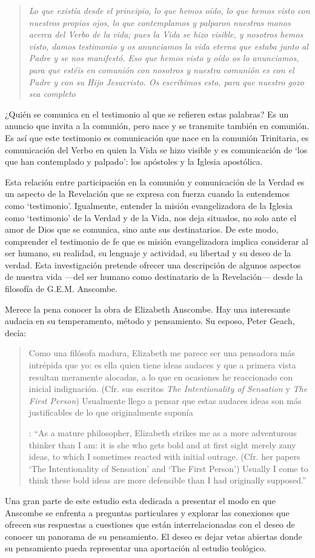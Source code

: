 \blockquote[][\,(1 Jn 1-4)]{\emph{Lo que existía desde el principio, lo que hemos oído, lo que hemos visto con nuestros propios ojos, lo que contemplamos y palparon nuestras manos acerca del Verbo de la vida; pues la Vida se hizo visible, y nosotros hemos visto, damos testimonio y os anunciamos la vida eterna que estaba junto al Padre y se nos manifestó. Eso que hemos visto y oído os lo anunciamos, para que estéis en comunión con nosotros y nuestra comunión es con el Padre y con su Hijo Jesucristo. Os escribimos esto, para que nuestro gozo sea completo}}. ¿Quién se comunica en el testimonio al que se refieren estas palabras? Es un anuncio que invita a la comunión, pero nace y se transmite también en comunión. Es así que este testimonio es comunicación que nace en la comunión Trinitaria, es comunicación del Verbo en quien la Vida se hizo visible y es comunicación de \enquote*{los que han contemplado y palpado}: los apóstoles y la Iglesia apostólica.

Esta relación entre participación en la comunión y comunicación de la Verdad es un aspecto de la Revelación que se expresa con fuerza cuando la entendemos como `testimonio'. Igualmente, entender la misión evangelizadora de la Iglesia como `testimonio' de la Verdad y de la Vida, nos deja situados, no solo ante el amor de Dios que se comunica, sino ante sus destinatarios. De este modo, comprender el testimonio de fe que es misión evangelizadora implica considerar al ser humano, su realidad, su lenguaje y actividad, su libertad y su deseo de la verdad. Esta investigación pretende ofrecer una descripción de algunos aspectos de nuestra vida ---del ser humano como destinatario de la Revelación--- desde la filosofía de G.E.M. Anscombe.

Merece la pena conocer la obra de Elizabeth Anscombe. Hay una interesante audacia en su temperamento, método y pensamiento. Su esposo, Peter Geach, decía: \blockquote[{\Cite[11]{geach1991philaut}}: \enquote{As a mature philosopher, Elizabeth strikes me as a more adventurous thinker than I am: it is she who gets bold and at first sight merely zany ideas, to which I sometimes reacted with initial outrage. (Cfr. her papers `The Intentionality of Sensation' and `The First Person') Usually I come to think these bold ideas are more defensible than I had originally supposed.}]{Como una filósofa madura, Elizabeth me parece ser una pensadora más intrépida que yo: es ella quien tiene ideas audaces y que a primera vista resultan meramente alocadas, a lo que en ocasiones he reaccionado con inicial indignación. (Cfr. sus escritos \emph{The Intentionality of Sensation} y \emph{The First Person}) Usualmente llego a pensar que estas audaces ideas son más justificables de lo que originalmente suponía}. Una gran parte de este estudio esta dedicada a presentar el modo en que Anscombe se enfrenta a preguntas particulares y explorar las conexiones que ofrecen sus respuestas a cuestiones que están interrelacionadas con el deseo de conocer un panorama de su pensamiento. El deseo es dejar vetas abiertas donde su pensamiento pueda representar una aportación al estudio teológico.

